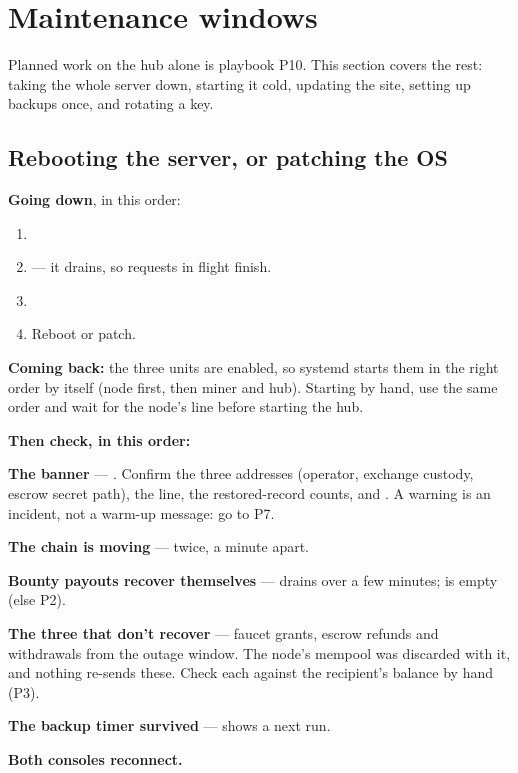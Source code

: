 \documentclass[11pt]{article}
\begin{document}
\section{Maintenance windows}

Planned work on the hub alone is playbook P10. This section covers the rest: taking the whole server down, starting it cold, updating the site, setting up backups once, and rotating a key.

\subsection{Rebooting the server, or patching the OS}

\textbf{Going down}, in this order:

\begin{enumerate}[leftmargin=1.5em]
  \item {}
  \item {} --- it drains, so requests in flight finish.
  \item {}
  \item Reboot or patch.
\end{enumerate}

\textbf{Coming back:} the three units are enabled, so systemd starts them in the right order by itself (node first, then miner and hub). Starting by hand, use the same order and wait for the node's  line before starting the hub.

\textbf{Then check, in this order:}

\begin{checklist}
  \item \textbf{The banner} --- . Confirm the three addresses (operator, exchange custody, escrow secret path), the  line, the restored-record counts, and . A  warning is an incident, not a warm-up message: go to P7.
  \item \textbf{The chain is moving} ---  twice, a minute apart.
  \item \textbf{Bounty payouts recover themselves} ---  drains over a few minutes;  is empty (else P2).
  \item \textbf{The three that don't recover} --- faucet grants, escrow refunds and withdrawals from the outage window. The node's mempool was discarded with it, and nothing re-sends these. Check each against the recipient's balance by hand (P3).
  \item \textbf{The backup timer survived} ---  shows a next run.
  \item \textbf{Both consoles reconnect.}
\end{checklist}
\end{document}
